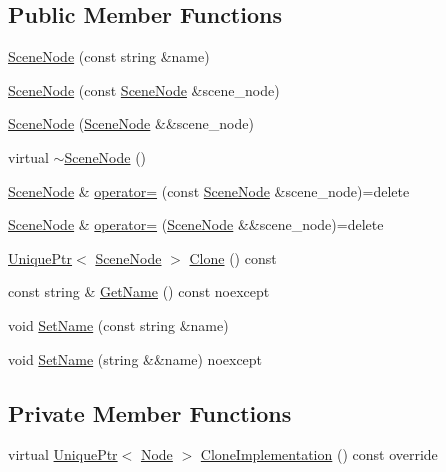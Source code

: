 \subsection*{Public Member Functions}
\begin{DoxyCompactItemize}
\item 
\hyperlink{classmage_1_1_scene_node_afc138707692a66952484ae2b3c6e15d5}{Scene\+Node} (const string \&name)
\item 
\hyperlink{classmage_1_1_scene_node_a0259a6b573eb633b589cd986b9ec6734}{Scene\+Node} (const \hyperlink{classmage_1_1_scene_node}{Scene\+Node} \&scene\+\_\+node)
\item 
\hyperlink{classmage_1_1_scene_node_acbf94ceadac62f2ccde13d70ce9298d7}{Scene\+Node} (\hyperlink{classmage_1_1_scene_node}{Scene\+Node} \&\&scene\+\_\+node)
\item 
virtual \hyperlink{classmage_1_1_scene_node_a6705beea9c535de3d495762ed06e74dd}{$\sim$\+Scene\+Node} ()
\item 
\hyperlink{classmage_1_1_scene_node}{Scene\+Node} \& \hyperlink{classmage_1_1_scene_node_af4298cbc808139f9da43055afdfe8f7e}{operator=} (const \hyperlink{classmage_1_1_scene_node}{Scene\+Node} \&scene\+\_\+node)=delete
\item 
\hyperlink{classmage_1_1_scene_node}{Scene\+Node} \& \hyperlink{classmage_1_1_scene_node_ae38092ba9ec8449f15b3c1f8285ba500}{operator=} (\hyperlink{classmage_1_1_scene_node}{Scene\+Node} \&\&scene\+\_\+node)=delete
\item 
\hyperlink{namespacemage_a8c307fbcc33bce9b7f2aa4c26c3b95cf}{Unique\+Ptr}$<$ \hyperlink{classmage_1_1_scene_node}{Scene\+Node} $>$ \hyperlink{classmage_1_1_scene_node_ae92f68ce03011b1c1d71421f077a00f8}{Clone} () const
\item 
const string \& \hyperlink{classmage_1_1_scene_node_ab4d72e26370747c06ccb1461f3080b31}{Get\+Name} () const noexcept
\item 
void \hyperlink{classmage_1_1_scene_node_a11a6d53a9ba637813b34347b68ad08d6}{Set\+Name} (const string \&name)
\item 
void \hyperlink{classmage_1_1_scene_node_a3dc6b033a811a9e1d6da0aa85b4f281b}{Set\+Name} (string \&\&name) noexcept
\end{DoxyCompactItemize}
\subsection*{Private Member Functions}
\begin{DoxyCompactItemize}
\item 
virtual \hyperlink{namespacemage_a8c307fbcc33bce9b7f2aa4c26c3b95cf}{Unique\+Ptr}$<$ \hyperlink{classmage_1_1_node}{Node} $>$ \hyperlink{classmage_1_1_scene_node_a42d0d53ab804d38ebd584d2de6490eeb}{Clone\+Implementation} () const override
\end{DoxyCompactItemize}
